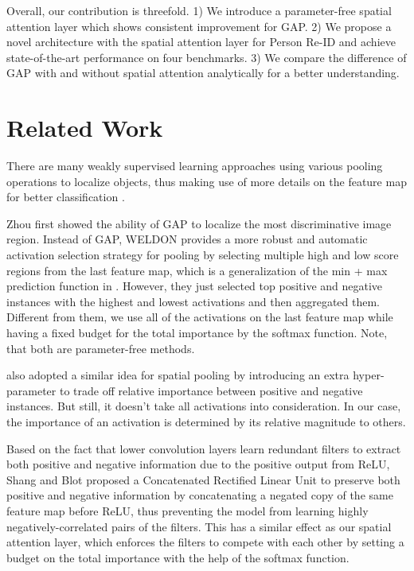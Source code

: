 \documentclass[10pt,twocolumn,letterpaper]{article}
\newcommand{\myparagraph}[1]{\vspace{3pt}\noindent{\bf #1}}
\begin{document}
Overall, our contribution is threefold. 1) We introduce a parameter-free spatial attention layer which shows consistent improvement for GAP. 2) We propose a novel architecture with the spatial attention layer for Person Re-ID and achieve state-of-the-art performance on four benchmarks. 3) We compare the difference of GAP with and without spatial attention analytically for a better understanding.







\section{Related Work}
\myparagraph{Weakly Supervised Learning.}
There are many weakly supervised learning approaches using various pooling operations to localize objects, thus making use of more details on the feature map for better classification \cite{mantra, parizi2014automatic, MIL, isthere}.

Zhou \etal \cite{CAM} first showed the ability of GAP to localize the most discriminative image region. Instead of GAP, WELDON \cite{weldon} provides a more robust and automatic activation selection strategy for pooling by selecting multiple high and low score regions from the last feature map, which is a generalization of the min + max prediction function in \cite{mantra}. However, they just selected top positive and negative instances with the highest and lowest activations and then aggregated them. Different from them, we use all of the activations on the last feature map while having a fixed budget for the total importance by the softmax function. Note, that both are parameter-free methods.

\cite{wildcat} also adopted a similar idea for spatial pooling by introducing an extra hyper-parameter to trade off relative importance between positive and negative instances. But still, it doesn't take all activations into consideration. In our case, the importance of an activation is determined by its relative magnitude to others.

Based on the fact that lower convolution layers learn redundant filters to extract both positive and negative information due to the positive output from ReLU, Shang \etal \cite{crelu} and Blot \etal \cite{minmaxconv} proposed a Concatenated Rectified Linear Unit to preserve both positive and negative information by concatenating a negated copy of the same feature map before ReLU, thus preventing the model from learning highly negatively-correlated pairs of the filters. This has a similar effect as our spatial attention layer, which enforces the filters to compete with each other by setting a budget on the total importance with the help of the softmax function.
\end{document}
